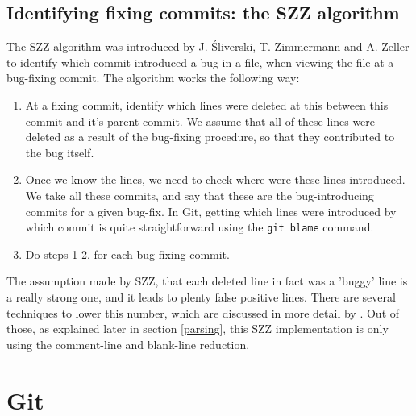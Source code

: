 \documentclass[12pt,twoside,notitlepage]{report}
\begin{document}
\subsection{Identifying fixing commits: the SZZ algorithm}\label{szz}
The SZZ algorithm was introduced by J. \'Sliverski, T. Zimmermann and A. Zeller \cite{SZZ} to identify which commit introduced a bug in a file, when viewing the file at a bug-fixing commit. The algorithm works the following way:
\begin{enumerate}
\item At a fixing commit, identify which lines were deleted at this between this commit and it's parent commit. We assume that all of these lines were deleted as a result of the bug-fixing procedure, so that they contributed to the bug itself.
\item Once we know the lines, we need to check where were these lines introduced. We take all these commits, and say that these are the bug-introducing commits for a given bug-fix. In Git, getting which lines were introduced by which commit is quite straightforward using the \texttt{git blame} command.
\item Do steps 1-2. for each bug-fixing commit.
\end{enumerate}
The assumption made by SZZ, that each deleted line in fact was a 'buggy' line is a really strong one, and it leads to plenty false positive lines. There are several techniques to lower this number, which are discussed in more detail by \cite{KimZim}. Out of those, as explained later in section \ref{parsing}, this SZZ implementation is only using the comment-line and blank-line reduction.
\section{Git}
\end{document}
